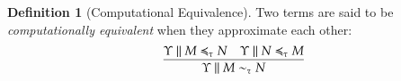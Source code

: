 \documentclass[11pt]{article}
\theoremstyle{definition}
\newtheorem{definition}[thm]{Definition}
\theoremstyle{remark}
\numberwithin{equation}{section}
\def\IModeColorName{MidnightBlue}
\def\OModeColorName{Maroon}
\def\IModeColorName{Black}
\def\OModeColorName{Black}
\newcommand\IMode[1]{{\color{\IModeColorName}{#1}}}
\newcommand\OMode[1]{{\color{\OModeColorName}{#1}}}
\newcommand\Of[2]{\IMode{#1}: \IMode{#2}}
\newcommand\Match[2]{\IMode{#1}\equiv\OMode{#2}}
\newcommand\Sets{\mathbf{Set}}
\newcommand\SCtx{\mathbf{SCtx}}
\newcommand\Ctx{\mathbf{Ctx}}
\newcommand\HypCat{\mathbf{H}}
\newcommand\Define[2]{\IMode{#1}\triangleq\OMode{#2}}
\newcommand\Pow[1]{\wp\left(#1\right)}
\newcommand\Exprs{\mathbf{E}}
\begin{document}
\begin{definition}[Computational Equivalence]
  Two terms are said to be \emph{computationally equivalent} when they approximate each other:
  \[
    \infer{
      \SBinRel{\sim_\tau}{\Upsilon}{M}{N}
    }{
      \SBinRel{\preccurlyeq_\tau}{\Upsilon}{M}{N} &
      \SBinRel{\preccurlyeq_\tau}{\Upsilon}{N}{M}
    }
  \]
\end{definition}

\end{document}
